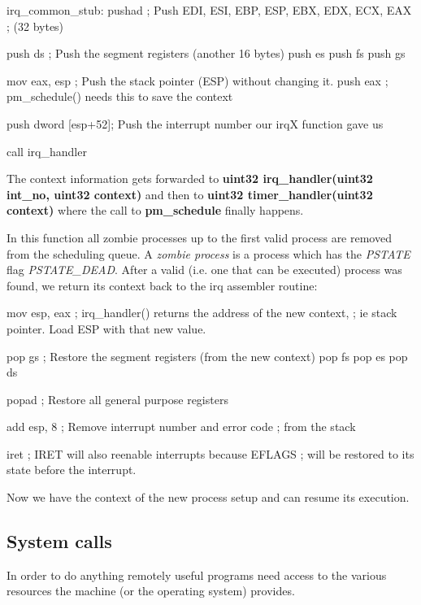 \documentclass[11pt,a4paper]{scrartcl}
\begin{document}
\begin{code}
irq_common_stub:
pushad              ; Push EDI, ESI, EBP, ESP, EBX, EDX, ECX, EAX
                    ; (32 bytes)

push ds             ; Push the segment registers (another 16 bytes)
push es
push fs
push gs

mov eax, esp       ; Push the stack pointer (ESP) without changing it.
push eax           ; pm_schedule() needs this to save the context

push dword [esp+52]; Push the interrupt number our irqX function gave us

call irq_handler
\end{code}

The context information gets forwarded to \textbf{uint32 irq\_handler(uint32 int\_no, uint32 context)} and then to \textbf{uint32 timer\_handler(uint32 context)} where the call to \textbf{pm\_schedule} finally happens.

In this function all zombie processes up to the first valid process are removed from the scheduling queue. A \textit{zombie process} is a process which has the \textit{PSTATE} flag \textit{PSTATE\_DEAD}. After a valid (i.e. one that can be executed) process was found, we return its context back to the irq assembler routine:

\begin{code}
mov esp, eax       ; irq_handler() returns the address of the new context,
                   ; ie stack pointer. Load ESP with that new value.

pop gs             ; Restore the segment registers (from the new context)
pop fs
pop es
pop ds

popad              ; Restore all general purpose registers

add esp, 8         ; Remove interrupt number and error code 
                   ; from the stack

iret               ; IRET will also reenable interrupts because EFLAGS
                   ; will be restored to its state before the interrupt.
\end{code}

Now we have the context of the new process setup and can resume its execution.

\subsection{System calls}
\hypertarget{SYSCALL}{}
In order to do anything remotely useful programs need access to the various resources the machine (or the operating system) provides.
\end{document}
